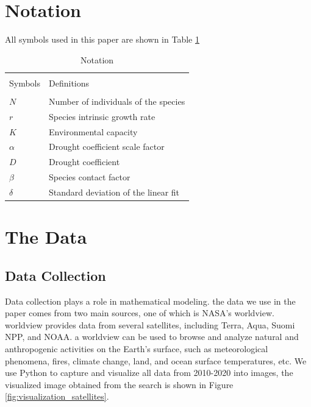 \documentclass[12pt]{article}
\begin{document}
\section{Notation}

All symbols used in this paper are shown in Table \ref{tab:notation}

\begin{table}[]
	\centering
	\caption{Notation}
	\begin{tabular}{@{}ll@{}}
		\toprule                                        \\
		Symbols  & Definitions                          \\
		\midrule                                        \\
		$N$      & Number of individuals of the species \\
		$r$      & Species intrinsic growth rate        \\
		$K$      & Environmental capacity               \\
		$\alpha$ & Drought coefficient scale factor     \\
		$D$      & Drought coefficient                  \\
		$\beta$  & Species contact factor               \\
		$\delta$ & Standard deviation of the linear fit \\
		\bottomrule
	\end{tabular}
	\label{tab:notation}
\end{table}

\section{The Data}

\subsection{Data Collection}

Data collection plays a role in mathematical modeling. the data we use in the paper comes from two main sources, one of which is NASA's worldview. worldview provides data from several satellites, including Terra, Aqua, Suomi NPP, and NOAA. a worldview can be used to browse and analyze natural and anthropogenic activities on the Earth's surface, such as meteorological phenomena, fires, climate change, land, and ocean surface temperatures, etc. We use Python to capture and visualize all data from 2010-2020 into images, the visualized image obtained from the search is shown in Figure \ref{fig:visualization_satellites}.
\end{document}
